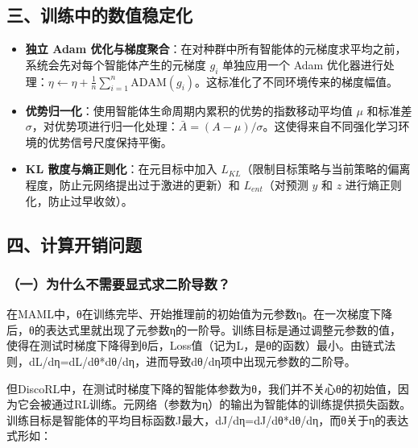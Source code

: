 \hypertarget{ux4e09ux8badux7ec3ux4e2dux7684ux6570ux503cux7a33ux5b9aux5316}{%
\subsection{三、训练中的数值稳定化}\label{ux4e09ux8badux7ec3ux4e2dux7684ux6570ux503cux7a33ux5b9aux5316}}

\begin{itemize}
\tightlist
\item
  \textbf{独立 Adam 优化与梯度聚合}：在对种群中所有智能体的元梯度求平均之前，系统会先对每个智能体产生的元梯度 \(g_i\) 单独应用一个 Adam 优化器进行处理：\(\eta \leftarrow \eta + \frac{1}{n}\sum_{i=1}^{n}\mathrm{ADAM}(g_i)\)。这标准化了不同环境传来的梯度幅值。
\item
  \textbf{优势归一化}：使用智能体生命周期内累积的优势的指数移动平均值 \(\mu\) 和标准差 \(\sigma\)，对优势项进行归一化处理：\(\bar{A} = (A-\mu)/\sigma\)。这使得来自不同强化学习环境的优势信号尺度保持平衡。
\item
  \textbf{KL 散度与熵正则化}：在元目标中加入 \(L_{KL}\)（限制目标策略与当前策略的偏离程度，防止元网络提出过于激进的更新）和 \(L_{ent}\)（对预测 \(y\) 和 \(z\) 进行熵正则化，防止过早收敛）。
\end{itemize}

\hypertarget{ux56dbux8ba1ux7b97ux5f00ux9500ux95eeux9898}{%
\subsection{四、计算开销问题}\label{ux56dbux8ba1ux7b97ux5f00ux9500ux95eeux9898}}

\hypertarget{ux4e00ux4e3aux4ec0ux4e48ux4e0dux9700ux8981ux663eux5f0fux6c42ux4e8cux9636ux5bfcux6570}{%
\subsubsection{（一）为什么不需要显式求二阶导数？}\label{ux4e00ux4e3aux4ec0ux4e48ux4e0dux9700ux8981ux663eux5f0fux6c42ux4e8cux9636ux5bfcux6570}}

在MAML中，θ在训练完毕、开始推理前的初始值为元参数η。在一次梯度下降后，θ的表达式里就出现了元参数η的一阶导。训练目标是通过调整元参数的值，使得在测试时梯度下降得到θ后，Loss值（记为L，是θ的函数）最小。由链式法则，dL/dη=dL/dθ*dθ/dη，进而导致dθ/dη项中出现元参数的二阶导。

但DiscoRL中，在测试时梯度下降的智能体参数为θ，我们并不关心θ的初始值，因为它会被通过RL训练。元网络（参数为η）的输出为智能体的训练提供损失函数。训练目标是智能体的平均目标函数J最大，dJ/dη=dJ/dθ*dθ/dη，而θ关于η的表达式形如：

